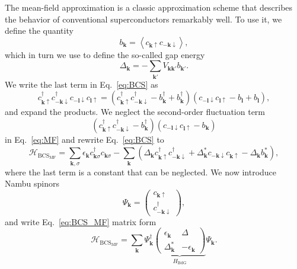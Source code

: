 The mean-field approximation is a classic approximation scheme that describes the behavior of conventional superconductors remarkably well.
To use it, we define the quantity
\begin{equation}
b_{\bm{k}}=\left\langle c_{\bm{k}\uparrow}c_{-\bm{k}\downarrow}\right\rangle ,
\end{equation}
which in turn we use to define the so-called gap energy
\begin{equation}
\Delta_{\bm{k}}=-\sum_{\bm{k'}}V_{\bm{kk'}}b_{\bm{k'}}.
\end{equation}
We write the last term in Eq.~\eqref{eq:BCS} as
\begin{equation}
c_{\bm{k}\uparrow}^{\dagger}c_{-\bm{k}\downarrow}^{\dagger}c_{-\bm{l}\downarrow}c_{\bm{l}\uparrow}=\left(c_{\bm{k}\uparrow}^{\dagger}c_{-\bm{k}\downarrow}^{\dagger}-b_{\bm{k}}^{\dagger}+b_{\bm{k}}^{\dagger}\right)\left(c_{-\bm{l}\downarrow}c_{\bm{l}\uparrow}-b_{\bm{l}}+b_{\bm{l}}\right),\label{eq:MF}
\end{equation}
and expand the products.
We neglect the second-order fluctuation term
\begin{equation}
\left(c_{\bm{k}\uparrow}^{\dagger}c_{-\bm{k}\downarrow}^{\dagger}-b_{\bm{k}}^{\dagger}\right)\left(c_{-\bm{l}\downarrow}c_{\bm{l}\uparrow}-b_{\bm{k}}\right)
\end{equation}
in Eq.~\eqref{eq:MF} and rewrite Eq.~\eqref{eq:BCS} to
\begin{equation}
\mathcal{H}_{\textrm{BCS}_{\textrm{MF}}}=\underset{\bm{k},\sigma}{\sum}\epsilon_{\bm{k}}c_{\bm{k}\sigma}^{\dagger}c_{\bm{k}\sigma}-\underset{\bm{k}}{\sum}\left(\Delta_{\bm{k}}c_{\bm{k}\uparrow}^{\dagger}c_{-\bm{k}\downarrow}^{\dagger}+\Delta_{\bm{k}}^{*}c_{-\bm{k}\downarrow}c_{\bm{k}\uparrow}-\Delta_{\bm{k}}b_{\bm{k}}^{*}\right),\label{eq:BCS_MF}
\end{equation}
where the last term is a constant that can be neglected.
We now introduce Nambu spinors
\begin{equation}
\Psi_{\bm{k}}=\left(\begin{array}{c}
c_{\bm{k}\uparrow}\\
c_{-\bm{k}\downarrow}^{\dagger}
\end{array}\right),\label{eq:Nambu}
\end{equation}
and write Eq.~\eqref{eq:BCS_MF} matrix form
\begin{equation}
\mathcal{H}_{\textrm{BCS}_{\textrm{MF}}}=\underset{\bm{k}}{\sum}\Psi_{\bm{k}}^{\dagger}\underset{H_{\textrm{BdG}}}{\underbrace{\left(\begin{array}{cc}
\epsilon_{\bm{k}} & \Delta\\
\Delta_{\bm{k}}^{*} & -\epsilon_{\bm{k}}
\end{array}\right)}}\Psi_{\bm{k}}.
\end{equation}
